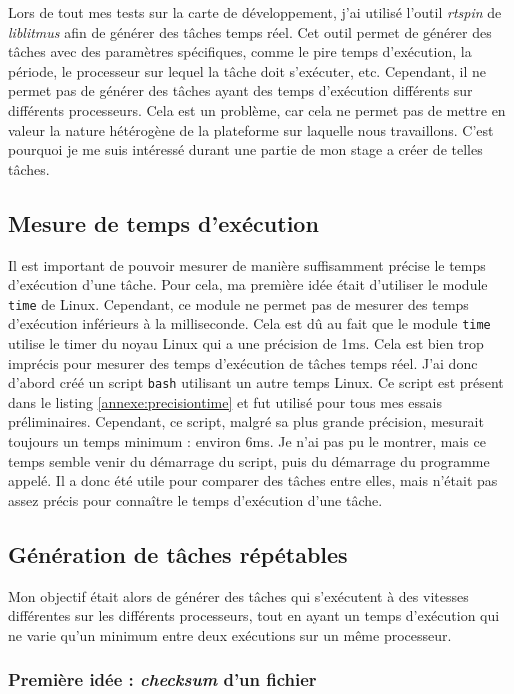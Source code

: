 Lors de tout mes tests sur la carte de développement, j'ai utilisé l'outil \textit{rtspin} de \textit{liblitmus} afin de générer des tâches temps réel. Cet outil permet de générer des tâches avec des paramètres spécifiques, comme le pire temps d'exécution, la période, le processeur sur lequel la tâche doit s'exécuter, etc. Cependant, il ne permet pas de générer des tâches ayant des temps d'exécution différents sur différents processeurs. Cela est un problème, car cela ne permet pas de mettre en valeur la nature hétérogène de la plateforme sur laquelle nous travaillons. C'est pourquoi je me suis intéressé durant une partie de mon stage a créer de telles tâches.

\subsection{Mesure de temps d'exécution}
Il est important de pouvoir mesurer de manière suffisamment précise le temps d'exécution d'une tâche. Pour cela, ma première idée était d'utiliser le module \texttt{time} de Linux. Cependant, ce module ne permet pas de mesurer des temps d'exécution inférieurs à la milliseconde. Cela est dû au fait que le module \texttt{time} utilise le timer du noyau Linux qui a une précision de 1ms. Cela est bien trop imprécis pour mesurer des temps d'exécution de tâches temps réel. J'ai donc d'abord créé un script \texttt{bash} utilisant un autre temps Linux. Ce script est présent dans le listing \ref{annexe:precisiontime} et fut utilisé pour tous mes essais préliminaires. Cependant, ce script, malgré sa plus grande précision, mesurait toujours un temps minimum : environ 6ms. Je n'ai pas pu le montrer, mais ce temps semble venir du démarrage du script, puis du démarrage du programme appelé. Il a donc été utile pour comparer des tâches entre elles, mais n'était pas assez précis pour connaître le temps d'exécution d'une tâche.


\subsection{Génération de tâches répétables}
\label{section:generation-taches-repetables}

Mon objectif était alors de générer des tâches qui s'exécutent à des vitesses différentes sur les différents processeurs, tout en ayant un temps d'exécution qui ne varie qu'un minimum entre deux exécutions sur un même processeur.

\subsubsection{Première idée : \textit{checksum} d'un fichier}

